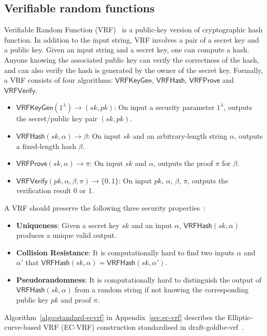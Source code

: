 \subsection{Verifiable random functions}

Verifiable Random Function (VRF)~\cite{micali1999verifiable} is a public-key version of cryptographic hash function.
In addition to the input string, VRF involves a pair of a secret key and a public key.
Given an input string and a secret key, one can compute a hash.
Anyone knowing the associated public key can verify the correctness of the hash, and can also verify the hash is generated by the owner of the secret key.
Formally, a VRF consists of four algorithms: $\mathsf{VRFKeyGen}$, $\mathsf{VRFHash}$, $\mathsf{VRFProve}$ and $\mathsf{VRFVerify}$.

\begin{itemize}
    \item $\mathsf{VRFKeyGen}(1^{\lambda}) \to (sk, pk)$: On input a security parameter $1^{\lambda}$, outputs the secret/public key pair $(sk, pk)$.
    \item $\mathsf{VRFHash}(sk, \alpha) \to \beta $: On input $sk$ and an arbitrary-length string $\alpha$, outputs a fixed-length hash $\beta$.
    \item $\mathsf{VRFProve}(sk, \alpha) \to \pi$: On input $sk$ and $\alpha$, outputs the proof $\pi$ for $\beta$.
    \item $\mathsf{VRFVerify}(pk, \alpha, \beta, \pi) \to \{0, 1\}$: On input $pk$, $\alpha$, $\beta$, $\pi$, outputs the verification result 0 or 1.
\end{itemize}

A VRF should preserve the following three security properties~\cite{goldberg2017draft}:

\begin{itemize}
    \item \textbf{Uniqueness}: Given a secret key $sk$ and an input $\alpha$, $\mathsf{VRFHash}(sk, \alpha)$ produces a unique valid output.
    \item \textbf{Collision Resistance}: It is computationally hard to find two inputs $\alpha$ and $\alpha'$ that $\mathsf{VRFHash}(sk, \alpha) = \mathsf{VRFHash}(sk, \alpha')$.
    \item \textbf{Pseudorandomness}: It is computationally hard to distinguish the output of $\mathsf{VRFHash}(sk, \alpha)$ from a random string if not knowing the corresponding public key $pk$ and proof $\pi$.
\end{itemize}

Algorithm~\ref{algo:standard-ecvrf} in Appendix~\ref{sec:ec-vrf} describes the Elliptic-curve-based VRF (EC-VRF) construction standardised in draft-goldbe-vrf~\cite{goldberg2017draft}.
